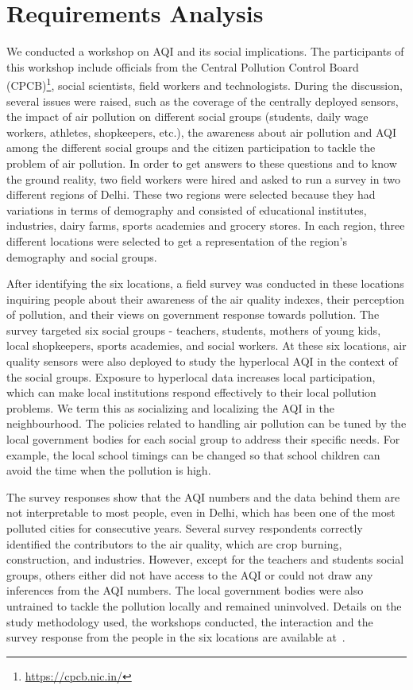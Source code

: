 \section{Requirements Analysis}
\label{sec:req-analysis}

We conducted a workshop on AQI and its social implications. The participants of this workshop include officials from the Central Pollution Control Board (CPCB)\footnote{\url{https://cpcb.nic.in/}}, social scientists, field workers and technologists. During the discussion, several issues were raised, such as the coverage of the centrally deployed sensors, the impact of air pollution on different social groups (students, daily wage workers, athletes, shopkeepers, etc.), the awareness about air pollution and AQI among the different social groups and the citizen participation to tackle the problem of air pollution. In order to get answers to these questions and to know the ground reality, two field workers were hired and asked to run a survey in two different regions of Delhi. These two regions were selected because they had variations in terms of demography and consisted of educational institutes, industries, dairy farms, sports academies and grocery stores. In each region, three different locations were selected to get a representation of the region's demography and social groups. 

After identifying the six locations, a field survey was conducted in these locations inquiring people about their awareness of the air quality indexes, their perception of pollution, and their views on government response towards pollution. The survey targeted six social groups - teachers, students, mothers of young kids, local shopkeepers, sports academies, and social workers. At these six locations, air quality sensors were also deployed to study the hyperlocal AQI in the context of the social groups. Exposure to hyperlocal data increases local participation, which can make local institutions respond effectively to their local pollution problems. We term this as socializing and localizing the AQI in the neighbourhood. The policies related to handling air pollution can be tuned by the local government bodies for each social group to address their specific needs. For example, the local school timings can be changed so that school children can avoid the time when the pollution is high.

The survey responses show that the AQI numbers and the data behind them are not interpretable to most people, even in Delhi, which has been one of the most polluted cities for consecutive years. Several survey respondents correctly identified the contributors to the air quality, which are crop burning, construction, and industries. However, except for the teachers and students social groups, others either did not have access to the AQI or could not draw any inferences from the AQI numbers. The local government bodies were also untrained to tackle the pollution locally and remained uninvolved. Details on the study methodology used, the workshops conducted, the interaction and the survey response from the people in the six locations are available at~\cite{samaj-saqi}. 

